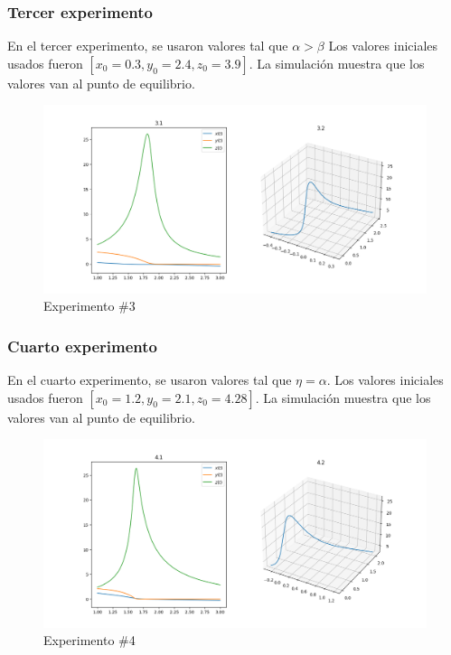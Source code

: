 \documentclass[12pt, a4paper]{article}
\begin{document}
\subsubsection*{Tercer experimento}

En el tercer experimento, se usaron valores tal que $\alpha > \beta$
Los valores iniciales usados fueron $[x_0=0.3, y_0=2.4, z_0=3.9]$. La simulación muestra 
que los valores van al punto de equilibrio.

\begin{figure}[h!]
    \includegraphics[width=\linewidth]{../images/3.png}
    \caption{Experimento \#3}
\end{figure}

\subsubsection*{Cuarto experimento}

En el cuarto experimento, se usaron valores tal que $\eta = \alpha$.
Los valores iniciales usados fueron $[x_0=1.2, y_0=2.1, z_0=4.28]$. La simulación muestra 
que los valores van al punto de equilibrio.

\begin{figure}[h!]
    \includegraphics[width=\linewidth]{../images/4.png}
    \caption{Experimento \#4}
\end{figure}
\end{document}
